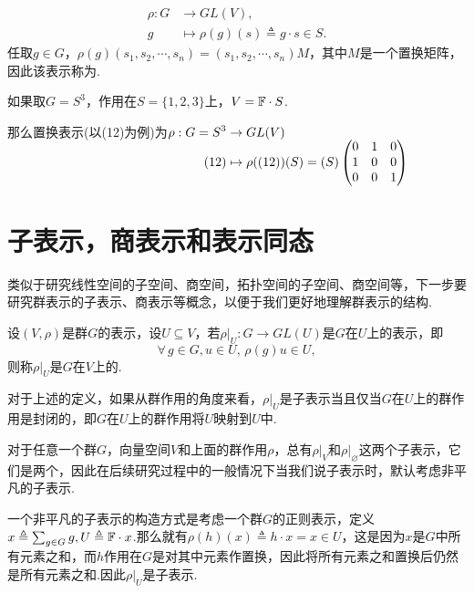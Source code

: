 \begin{instance}[常见的群表示]
\begin{enumerate}
\begin{align*}
            \rho:G&\to GL(V), \\[-6pt]
            g&\mapsto\rho(g)(s)\triangleq g\cdot s\in S.
        \end{align*}
        任取$g\in G$，$\rho(g)(s_1,s_2,\cdots,s_n)=(s_1,s_2,\cdots,s_n)M$，其中$M$是一个置换矩阵，因此该表示称为.\par
        如果取$G=S^3$，作用在$S=\{1,2,3\}$上，$V=\mathbb{F}\cdot S$.\par
        那么置换表示(以(12)为例)为$\setjot[-2]\begin{aligned}[t]
            \rho:G=S^3&\to GL(V) \\
            (12)&\mapsto \rho((12))(S)=(S)\begin{pmatrix}
                0 & 1 & 0 \\
                1 & 0 & 0 \\
                0 & 0 & 1
            \end{pmatrix}
        \end{aligned}$
    \end{enumerate}
\end{instance}


\section{子表示，商表示和表示同态}
类似于研究线性空间的子空间、商空间，拓扑空间的子空间、商空间等，下一步要研究群表示的子表示、商表示等概念，以便于我们更好地理解群表示的结构.\par

\begin{definition}[子表示]
    设$(V,\rho)$是群$G$的表示，设$U\subseteq V$，若$\rho|_U:G\to GL(U)$是$G$在$U$上的表示，即\begin{equation*}
        \forall\, g\in G,u\in U,\, \rho(g)u\in U,
    \end{equation*}
    则称$\rho|_U$是$G$在$V$上的.
\end{definition}

对于上述的定义，如果从群作用的角度来看，$\rho|_U$是子表示当且仅当$G$在$U$上的群作用是封闭的，即$G$在$U$上的群作用将$U$映射到$U$中.\par
对于任意一个群$G$，向量空间$V$和上面的群作用$\rho$，总有$\rho|_V$和$\rho|_\varnothing$这两个子表示，它们是两个，因此在后续研究过程中的一般情况下当我们说子表示时，默认考虑非平凡的子表示.\par
一个非平凡的子表示的构造方式是考虑一个群$G$的正则表示，定义$x\triangleq\sum_{g\in G}g,U\triangleq\mathbb{F}\cdot x$.那么就有$\rho(h)(x)\triangleq h\cdot x=x\in U$，这是因为$x$是$G$中所有元素之和，而$h$作用在$G$是对其中元素作置换，因此将所有元素之和置换后仍然是所有元素之和.因此$\rho|_U$是子表示.\par

